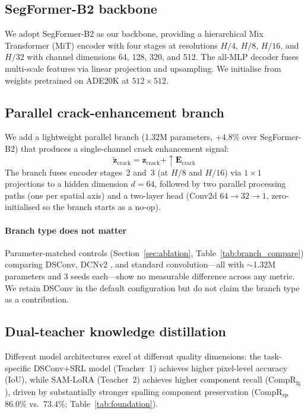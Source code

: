 \documentclass[review,authoryear]{elsarticle}
\begin{document}
\subsection{SegFormer-B2 backbone}

We adopt SegFormer-B2 \citep{xie2021segformer} as our backbone, providing a hierarchical Mix Transformer (MiT) encoder with four stages at resolutions $H/4$, $H/8$, $H/16$, and $H/32$ with channel dimensions 64, 128, 320, and 512. The all-MLP decoder fuses multi-scale features via linear projection and upsampling. We initialise from weights pretrained on ADE20K at $512{\times}512$.

\subsection{Parallel crack-enhancement branch}
\label{sec:dsconv}

We add a lightweight parallel branch (1.32M parameters, +4.8\% over SegFormer-B2) that produces a single-channel crack enhancement signal:
\begin{equation}
    \tilde{\mathbf{z}}_{\text{crack}} = \mathbf{z}_{\text{crack}} + \uparrow\!\mathbf{E}_{\text{crack}}
    \label{eq:dsconv}
\end{equation}
The branch fuses encoder stages~2 and~3 (at $H/8$ and $H/16$) via $1{\times}1$ projections to a hidden dimension $d{=}64$, followed by two parallel processing paths (one per spatial axis) and a two-layer head (Conv2d $64{\to}32{\to}1$, zero-initialised so the branch starts as a no-op).

\paragraph{Branch type does not matter}
Parameter-matched controls (Section~\ref{sec:ablation}, Table~\ref{tab:branch_compare}) comparing DSConv, DCNv2 \citep{dai2017deformable}, and standard convolution---all with ${\sim}$1.32M parameters and 3 seeds each---show no measurable difference across any metric.
We retain DSConv in the default configuration but do not claim the branch type as a contribution.

\subsection{Dual-teacher knowledge distillation}
\label{sec:dtkd}

Different model architectures excel at different quality dimensions: the task-specific DSConv+SRL model (Teacher~1) achieves higher pixel-level accuracy (IoU), while SAM-LoRA (Teacher~2) achieves higher component recall (CompR$_{\text{fg}}$), driven by substantially stronger spalling component preservation (CompR$_{\text{sp}}$ 86.0\% vs.\ 73.4\%; Table~\ref{tab:foundation}).
\end{document}
